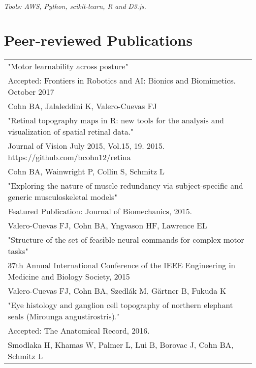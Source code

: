 \documentclass[10pt,a4paper]{article}
\begin{document}
  \vspace*{2mm}\setlength\parindent{2mm}\begin{minipage}{16.8cm}
    \textit{Tools: AWS, Python, scikit-learn, R and D3.js.} 
  \end{minipage}

  \vspace*{3mm}\section*{Peer-reviewed Publications}

  \vspace*{1mm}\begin{tabularx}{17cm}{X}
    "Motor learnability across posture" \\
    Accepted: Frontiers in Robotics and AI: Bionics and Biomimetics. October 2017 \\
    Cohn BA, Jalaleddini K, Valero-Cuevas FJ \\[2mm]

    "Retinal topography maps in R: new tools for the analysis and visualization of spatial retinal data." \\
    Journal of Vision July 2015, Vol.15, 19.  2015. https://github.com/bcohn12/retina \\
    Cohn BA, Wainwright P, Collin S, Schmitz L \\[2mm]

    "Exploring the nature of muscle redundancy via subject-specific and generic musculoskeletal models" \\
    Featured Publication: Journal of Biomechanics, 2015. \\
    Valero-Cuevas FJ, Cohn BA, Yngvason HF, Lawrence EL \\[2mm]

    "Structure of the set of feasible neural commands for complex motor tasks" \\
    37th Annual International Conference of the IEEE Engineering in Medicine and Biology Society, 2015 \\
    Valero-Cuevas FJ, Cohn BA, Szedl\'{a}k M, G{\"a}rtner B, Fukuda K \\[2mm]

    "Eye histology and ganglion cell topography of northern elephant seals (Mirounga angustirostris)." \\
    Accepted: The Anatomical Record, 2016. \\
    Smodlaka H, Khamas W, Palmer L, Lui B, Borovac J, Cohn BA, Schmitz L \\[2mm]
    
  \end{tabularx}
\end{document}

